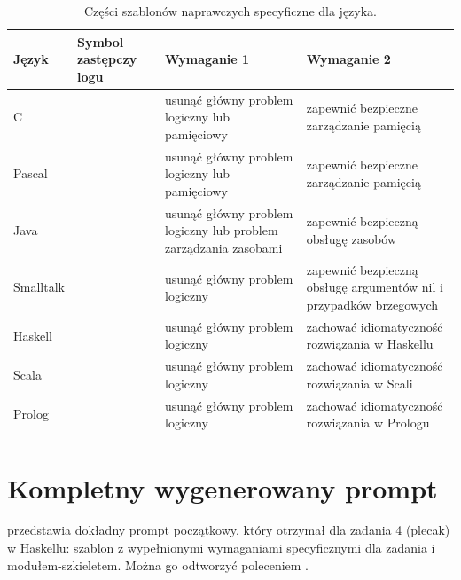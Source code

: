 \begin{table}[htbp]
  \centering
  \caption{Części szablonów naprawczych specyficzne dla języka.}
  \label{tab:followup}
  \small
  \begin{tabularx}{\textwidth}{@{}llYY@{}}
    \toprule
    Język & Symbol zastępczy logu & Wymaganie 1 & Wymaganie 2 \\
    \midrule
    C         &  & usunąć główny problem logiczny lub pamięciowy & zapewnić bezpieczne zarządzanie pamięcią \\
    Pascal    &                    & usunąć główny problem logiczny lub pamięciowy & zapewnić bezpieczne zarządzanie pamięcią \\
    Java      &  & usunąć główny problem logiczny lub problem zarządzania zasobami & zapewnić bezpieczną obsługę zasobów \\
    Smalltalk &       & usunąć główny problem logiczny & zapewnić bezpieczną obsługę argumentów nil i przypadków brzegowych \\
    Haskell   &                    & usunąć główny problem logiczny & zachować idiomatyczność rozwiązania w Haskellu \\
    Scala     &                    & usunąć główny problem logiczny & zachować idiomatyczność rozwiązania w Scali \\
    Prolog    &                    & usunąć główny problem logiczny & zachować idiomatyczność rozwiązania w Prologu \\
    \bottomrule
  \end{tabularx}
\end{table}

\section{Kompletny wygenerowany prompt}

 przedstawia dokładny prompt początkowy, który \haiku{} otrzymał dla zadania 4
(plecak) w Haskellu: szablon z wypełnionymi wymaganiami specyficznymi dla zadania i modułem-szkieletem.
Można go odtworzyć poleceniem .

